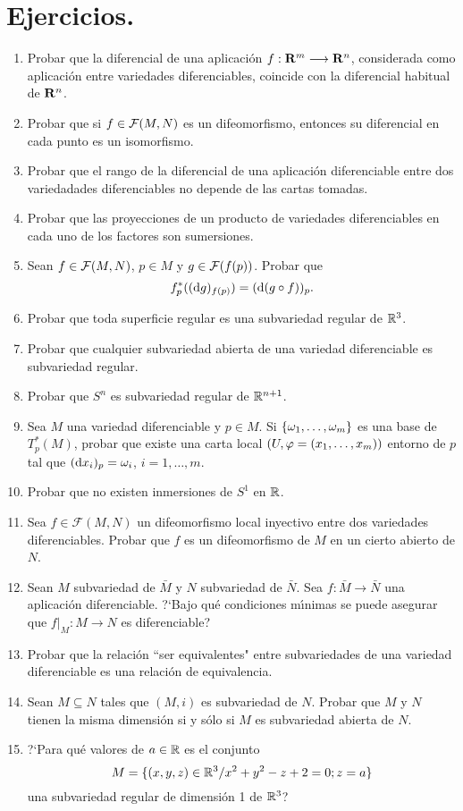 \documentclass[cursovd_portada.tex]{subfiles}
\begin{document}
\section{Ejercicios.}
\begin{enumerate}
\item Probar que la diferencial de una aplicaci\'{o}n $f:{\bf R}^m
\longrightarrow {\bf R}^n$, considerada como aplicaci\'{o}n entre
variedades diferenciables, coincide con la diferencial habitual de
${\bf R}^n$. \item Probar que si $f\in{\cal F}(M,N)$ es un
difeomorfismo, entonces su diferencial en cada punto es un
isomorfismo. \item Probar que el rango de la diferencial de una
aplicaci\'{o}n diferenciable entre dos variedadades diferenciables
no depende de las cartas tomadas. \item Probar que las
proyecciones de un producto de variedades diferenciables en cada
uno de los factores son sumersiones. \item Sean
$f\in{\cal F}(M,N)$, $p\in M$ y $g\in{\cal F}(f(p))$. Probar que
$$f_p^*(({\rm d} g)_{f(p)})=({\rm d} (g\circ f))_p.$$ \item Probar que
toda superficie regular es una subvariedad regular de $\mathbb{R}^3$.
\item Probar que cualquier subvariedad abierta de una variedad
diferenciable es subvariedad regular. \item Probar que $S^n$ es
subvariedad regular de $\mathbb{R}^{n+1}$.
\item Sea $M$ una variedad diferenciable y $p\in M$. Si
$\{\omega_1,\dots ,\omega_m\}$ es una base de $T_p^*(M)$, probar que
existe una carta local $(U,\varphi=(x_1,\dots ,x_m))$ entorno de $p$
tal que $({\rm d} x_i)_p=\omega_i$, $i=1,\dots ,m$. \item Probar que
no existen inmersiones de $S^1$ en $\mathbb{R}$. \item Sea
$f\in\mathcal{F}(M,N)$ un difeomorfismo local inyectivo entre dos
variedades diferenciables. Probar que $f$ es un difeomorfismo de
$M$ en un cierto abierto de $N$. \item Sean $M$ subvariedad de
$\bar{M}$ y $N$ subvariedad de $\bar{N}$. Sea $f: \bar{M}
\longrightarrow \bar{N}$ una aplicaci\'{o}n diferenciable. ?`Bajo
qu\'{e} condiciones m\'{\i}nimas se puede asegurar que $f|_M:M
\longrightarrow N$ es diferenciable? \item Probar que la
relaci\'{o}n ``ser equivalentes" entre subvariedades de una
variedad diferenciable es una relaci\'{o}n de equivalencia.
\item Sean $M\subseteq N$ tales que $(M,i)$ es subvariedad de $N$. Probar que $M$ y $N$ tienen la misma dimensi\'on si y s\'olo si $M$ es subvariedad abierta de $N$.
\item
?`Para qu\'{e} valores de $a\in\mathbb{R}$ es el conjunto
$$M=\{(x,y,z)\in\mathbb{R}^3/x^2+y^2-z+2=0;z=a\}$$
una subvariedad regular de dimensi\'{o}n 1 de $\mathbb{R}^3$?
\end{enumerate}
\end{document}
